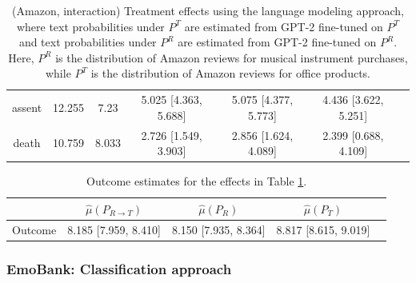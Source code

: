 \documentclass{article}
\begin{document}
\begin{table}[!ht]
\begin{tabular}{c|cccccc}
    assent      &             12.255 &              7.23  & 5.025 [4.363, 5.688]             & 5.075 [4.377, 5.773]  & 4.436 [3.622, 5.251]   \\
    death       &             10.759 &              8.033 & 2.726 [1.549, 3.903]             & 2.856 [1.624, 4.089]  & 2.399 [0.688, 4.109]   \\
\bottomrule
    \end{tabular}
    \caption{(Amazon, interaction) Treatment effects using the language modeling approach, where text probabilities under $P^T$ are estimated from GPT-2 fine-tuned on $P^T$ and text probabilities under $P^R$ are estimated from GPT-2 fine-tuned on $P^R$. Here, $P^R$ is the distribution of Amazon reviews for musical instrument purchases, while $P^T$ is the distribution of Amazon reviews for office products.}
    \label{tab:results_clm_gpt2_finetuned_amazon_synthetic_interaction_ptpr}
\end{table}

\begin{table}[!ht]
    \centering
    \begin{tabular}{c|cccc}
\toprule
    & $\hat{\mu}(P_{R \rightarrow T})$   & $\hat{\mu}(P_R)$     & $\hat{\mu}(P_T)$     \\
\midrule
    Outcome & 8.185 [7.959, 8.410]               & 8.150 [7.935, 8.364] & 8.817 [8.615, 9.019] \\
\bottomrule
    \end{tabular}
    \caption{Outcome estimates for the effects in Table \ref{tab:results_clm_gpt2_finetuned_amazon_synthetic_interaction_ptpr}.}
    \label{tab:results_clm_gpt2_finetuned_amazon_synthetic_interaction_outcome_ptpr}
\end{table}


\newpage
\subsubsection{EmoBank: Classification approach}
\end{document}
